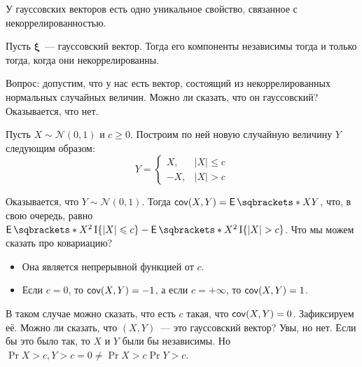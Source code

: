 У гауссовских векторов есть одно уникальное свойство, связанное с 
некоррелированностью.
\begin{theorem}
	Пусть \(\bm{\xi}\)~--- гауссовский вектор. Тогда его компоненты независимы 
	тогда и только тогда, когда они некоррелированны.
\end{theorem}

Вопрос: допустим, что у нас есть вектор, состоящий из некоррелированных 
нормальных случайных величин. Можно ли сказать, что он гауссовский? 
Оказывается, что нет.
\begin{example}
	Пусть \(X \sim \mathcal{N}(0, 1)\) и \(c \geq 0\). Построим по ней новую 
	случайную величину \(Y\) следующим образом:
	\[
		Y = \begin{cases}
		X,& |X| \leq c \\
		-X,& |X| > c
		\end{cases}
	\]
	
	Оказывается, что \(Y \sim \mathcal{N}(0, 1)\). Тогда \(\cov(X, Y) = 
	\E{XY}\), что, в свою очередь, равно \(\E{X^{2}\I\{|X| \leq c\}} - 
	\E{X^{2}\I\{|X| > c\}}\). Что мы можем сказать про ковариацию?
	\begin{itemize}
		\item Она является непрерывной функцией от \(c\).
		\item Если \(c = 0\), то \(\operatorname{\mathsf{cov}}(X, Y) = -1\), а если \(c = +\infty\), 
		то \(\operatorname{\mathsf{cov}}(X, Y) = 1\).
	\end{itemize}

	В таком случае можно сказать, что есть \(c\) такая, что \(\operatorname{\mathsf{cov}}(X, Y) = 0\). 
	Зафиксируем её. Можно ли сказать, что \((X, Y)\)~--- это гауссовский 
	вектор? Увы, но нет. Если бы это было так, то \(X\) и \(Y\) были бы 
	независимы. Но \(\Pr{X > c, Y > c} = 0 \neq \Pr{X > c}\Pr{Y > c}\).
\end{example}


